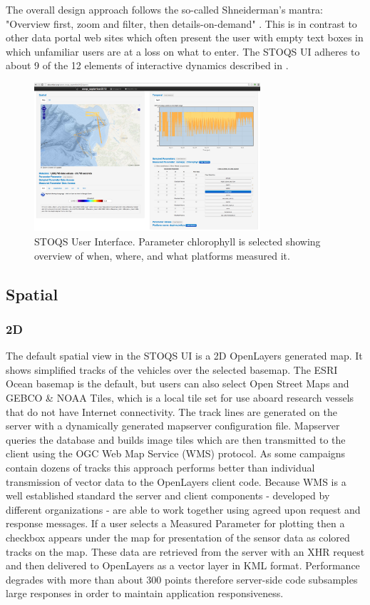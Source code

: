 \documentclass[conference]{IEEEtran}
\begin{document}
The overall design approach follows the so-called Shneiderman's mantra: "Overview first, zoom and filter, then details-on-demand" \cite{Whitney:2012:DIN:2597850}. This is in contrast to other data portal web sites which often present the user with empty text boxes in which unfamiliar users are at a loss on what to enter. The STOQS UI adheres to about 9 of the 12 elements of interactive dynamics described in \cite{Heer:2012:IDV:2133416.2146416}.

\begin{figure}[htbp]
\centering
\includegraphics[width=3.3in]{STOQSscreencapture.png}
\caption{STOQS User Interface. Parameter chlorophyll is selected showing overview of when, where, and what platforms measured it.}
\label{fig:STOQSscreencapture}
\end{figure}

\subsection{Spatial}

\subsubsection{2D}
The default spatial view in the STOQS UI is a 2D OpenLayers generated map. It shows simplified tracks of the vehicles over the selected basemap. The ESRI Ocean basemap is the default, but users can also select Open Street Maps and GEBCO \& NOAA Tiles, which is a local tile set for use aboard research vessels that do not have Internet connectivity. The track lines are generated on the server with a dynamically generated mapserver configuration file. Mapserver queries the database and builds image tiles which are then transmitted to the client using the OGC Web Map Service (WMS) protocol. As some campaigns contain dozens of tracks this approach performs better than individual transmission of vector data to the OpenLayers client code. Because WMS is a well established standard the server and client components - developed by different organizations - are able to work together using agreed upon request and response messages. If a user selects a Measured Parameter for plotting then a checkbox appears under the map for presentation of the sensor data as colored tracks on the map. These data are retrieved from the server with an XHR request and then delivered to OpenLayers as a vector layer in KML format. Performance degrades with more than about 300 points therefore server-side code subsamples large responses in order to maintain application responsiveness.
\end{document}
